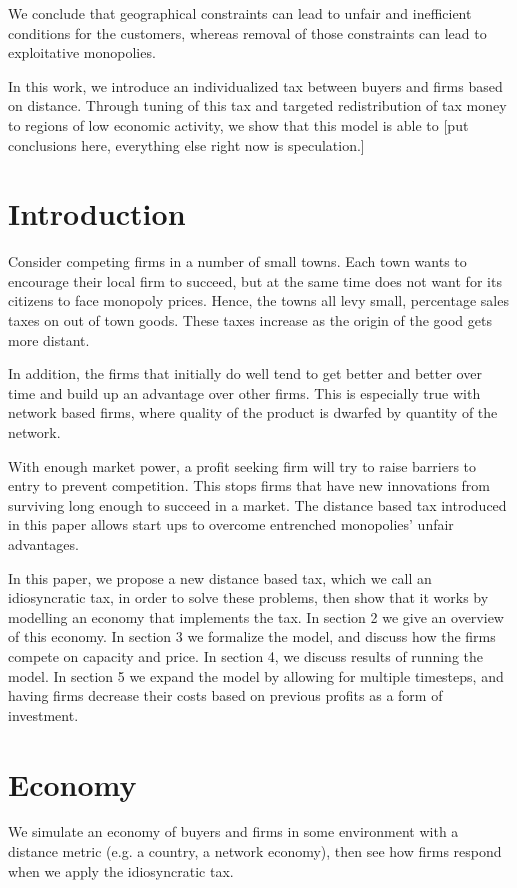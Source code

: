\documentclass[11pt]{article}
\begin{document}
We conclude that geographical constraints can lead to unfair and inefficient
conditions for the customers, whereas removal of those constraints can lead to
exploitative monopolies.

In this work, we introduce an individualized tax between buyers and firms based
on distance. Through tuning of this tax and targeted redistribution of tax
money to regions of low economic activity, we show that this model is able to
[put conclusions here, everything else right now is speculation.]

\section{Introduction}
Consider competing firms in a number of small towns. Each town wants to
encourage their local firm to succeed, but at the same time does not want for
its citizens to face monopoly prices. Hence, the towns all levy small,
percentage sales taxes on out of town goods. These taxes increase as the origin
of the good gets more distant.

In addition, the firms that initially do well tend to get better and better
over time and build up an advantage over other firms. This is especially true
with network based firms, where quality of the product is dwarfed by quantity
of the network. 

With enough market power, a profit seeking firm will try to raise barriers to
entry to prevent competition. This stops firms that have new innovations from
surviving long enough to succeed in a market. The distance based tax introduced
in this paper allows start ups to overcome entrenched monopolies' unfair
advantages.

In this paper, we propose a new distance based tax, which we call an
idiosyncratic tax, in order to solve these
problems, then show that it works by modelling an economy that implements the
tax. In section 2 we give an overview of this economy. In section 3 we
formalize the model, and discuss how the firms compete on capacity and price.
In section 4, we discuss results of running the model. In section 5 we expand
the model by allowing for multiple timesteps, and having firms decrease their
costs based on previous profits as a form of investment.

\section{Economy}
We simulate an economy of buyers and firms in some environment with a distance
metric (e.g. a country, a network economy), then see how firms respond when we
apply the idiosyncratic tax.
\end{document}
